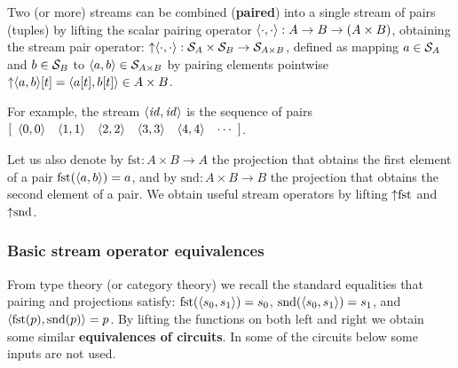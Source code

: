 Two (or more) streams can be combined (\textbf{paired})
into a single stream of pairs (tuples) by lifting the scalar pairing operator $\langle \cdot,\cdot \rangle: A \rightarrow B \rightarrow (A \times B)$,
obtaining the stream pair operator:
${\uparrow}\langle \cdot,\cdot \rangle: \mathcal{S}_{A} \times \mathcal{S}_{B} \to \mathcal{S}_{A \times B}$,
defined as mapping $a\in\mathcal{S}_{A}$ and $b\in\mathcal{S}_{B}$ to $\langle a,b \rangle\in\mathcal{S}_{A \times B}$
by pairing elements pointwise ${\uparrow}\langle a,b \rangle[t] = \langle a[t],b[t] \rangle \in A \times B$.

For example, the stream $\langle \mathit{id},\mathit{id} \rangle$ is the sequence of pairs \\
$\sv{\pair{0}{0} \pair{1}{1} \pair{2}{2} \pair{3}{3} \pair{4}{4}}$.

Let us also denote by $\mbox{fst}: A \times B \rightarrow A$
the projection that obtains the first element of a pair $\mbox{fst}(\langle a,b \rangle) = a$,
and by $\mbox{snd}: A \times B \rightarrow B$ the
projection that obtains the second element of a pair. We obtain useful
stream operators by lifting
${\uparrow}\mbox{fst}$ and ${\uparrow}\mbox{snd}$.

\subsubsection{Basic stream operator equivalences}
\label{sec:pairing}

From type theory (or category theory) we recall the standard equalities that pairing and projections satisfy:
$\mbox{fst}(\langle s_0,s_1 \rangle)=s_0$, $\mbox{snd}(\langle s_0,s_1 \rangle)=s_1$, and
$\langle \mbox{fst}(p),\mbox{snd}(p) \rangle=p$.  By lifting the functions
on both left and right we obtain some similar \textbf{equivalences of circuits}.
In some of the circuits below some inputs are not used.

